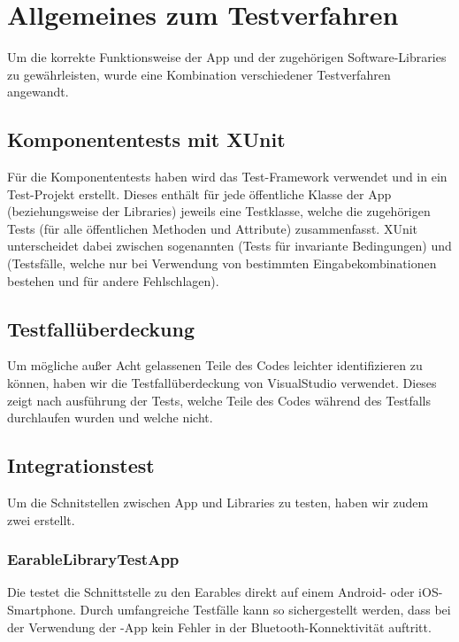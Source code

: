 \documentclass[../validierung.tex]{subfiles}
\begin{document}
\clearpage

\section{Allgemeines zum Testverfahren}
Um die korrekte Funktionsweise der App  und der zugehörigen Software-Libraries zu gewährleisten,
wurde eine Kombination verschiedener Testverfahren angewandt.

\subsection{Komponententests mit XUnit}
Für die Komponententests haben wird das Test-Framework  verwendet und in  ein Test-Projekt erstellt.
Dieses enthält für jede öffentliche Klasse der App (beziehungsweise der Libraries) jeweils eine Testklasse, welche die zugehörigen Tests (für alle öffentlichen Methoden und Attribute) zusammenfasst.
XUnit unterscheidet dabei zwischen sogenannten  (Tests für invariante Bedingungen) und  (Testsfälle, welche nur bei Verwendung von bestimmten Eingabekombinationen bestehen und für andere Fehlschlagen).

\subsection{Testfallüberdeckung}
Um mögliche außer Acht gelassenen Teile des Codes leichter identifizieren zu können, haben wir die Testfallüberdeckung von VisualStudio verwendet.
Dieses zeigt nach ausführung der Tests, welche Teile des Codes während des Testfalls durchlaufen wurden und welche nicht.

\subsection{Integrationstest}
Um die Schnitstellen zwischen App und Libraries zu testen, haben wir zudem zwei  erstellt.

\subsubsection{EarableLibraryTestApp}
Die  testet die Schnittstelle zu den Earables direkt auf einem Android- oder iOS-Smartphone.
Durch umfangreiche Testfälle kann so sichergestellt werden, dass bei der Verwendung der -App kein Fehler in der Bluetooth-Konnektivität auftritt.
\end{document}

